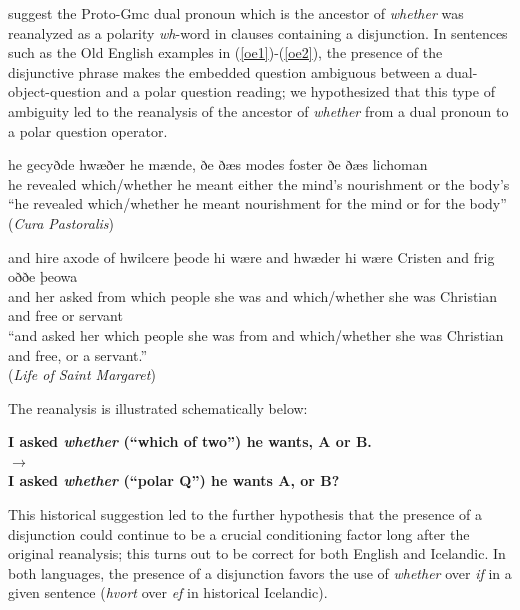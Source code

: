 	
\citet{baileywallenbergwurff2012} suggest the Proto-Gmc dual pronoun which is the ancestor of \textsl{whether} was reanalyzed as a polarity \textsl{wh}-word in clauses containing a disjunction. In sentences such as the Old English examples in (\ref{oe1})-(\ref{oe2}), the presence of the disjunctive phrase makes the embedded question ambiguous between a dual-object-question and a polar question reading; we hypothesized that this type of ambiguity led to the reanalysis of the ancestor of \textsl{whether} from a dual pronoun to a polar question operator.

\begin{exe}
    	\ex \label{oe1} \gll he gecyðde hwæðer            he mænde, ðe      ðæs modes foster           ðe ðæs lichoman \\
	he revealed which/whether he meant either the  mind's nourishment or the  body's\\
	\quad ``he revealed which/whether he meant nourishment for the mind or for the body''\\
	(\textsl{Cura Pastoralis})
	
		\ex \label{oe2} \gll and hire axode of    hwilcere þeode  hi  wære and hwæder             hi  wære Cristen    and frig oððe þeowa  \\
	and her  asked from which    people she was and which/whether she was   Christian and free or     servant\\
	\quad ``and asked her which people she was from and which/whether she was Christian and free, or a servant.''\\
	(\textsl{Life of Saint Margaret})
	
\end{exe}

\noindent The reanalysis is illustrated schematically below:

\begin{center}
 \textbf{I asked \textsl{whether} (``which of two'') he wants, A or B.} \\$\longrightarrow$ 
 \\ \textbf{I asked \textsl{whether} (``polar Q'') he wants A, or B?}
\end{center}

This historical suggestion led to the further hypothesis that the presence of a disjunction could continue to be a crucial conditioning factor long after the original reanalysis; this turns out to be correct for both English and Icelandic. 
In both languages, the presence of a disjunction favors the use of \textsl{whether} over \textsl{if} in a given sentence (\textsl{hvort} over \textsl{ef} in historical Icelandic).

